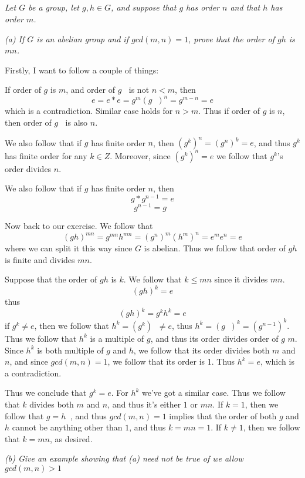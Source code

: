 \documentclass[11pt,oneside,titlepage]{book}
\DeclareMathOperator \inv {^{-1}}
\begin{document}
\subsection{}

\textit{Let $G$ be a group, let $g, h \in G$, and suppose that $g$ has
  order $n$ and that $h$ has order $m$.}

\textit{(a) If $G$ is an abelian group and if $gcd(m, n) = 1$, prove that
  the order of $gh$ is $mn$.}

Firstly, I want to follow a couple of things:

If order of $g$ is $m$, and order of $g\inv$ is not $n < m$, then
$$e = e * e = g^m (g\inv)^n = g^{m - n} = e$$
which is a contradiction. Similar case holds for $n > m$.  Thus if
order of $g$ is $n$, then order of $g\inv$ is also $n$.

We also follow that if $g$ has finite order $n$, then $(g^k)^n =
(g^n)^k = e$, and thus $g^k$ has finite order for any $k \in Z$.
Moreover, since $(g^k)^n = e$ we follow that $g^k$'s order divides $n$.

We also follow that if $g$ has finite order $n$, then
$$g * g^{n - 1} = e$$
$$g^{n - 1} = g\inv$$


Now back to our exercise. We follow that
$$(gh)^{mn} = g^{mn} h^{mn} = (g^{n})^m (h^m)^n = e^m e^n = e$$
where we can split it this way since $G$ is abelian. Thus we follow
that order of $gh$ is finite and divides $mn$.

Suppose that the order of $gh$ is $k$. We follow that $k \leq mn$
since it divides $mn$.
$$(gh)^k = e$$
thus
$$(gh)^k = g^k h^k = e$$
if $g^k \neq e$, then we follow that $h^k = (g^k) \inv \neq e$, thus
$h^k = (g\inv)^k = (g^{n - 1})^k$. Thus we follow that $h^k$ is a
multiple of $g$, and thus its order divides order of $g$ $m$. Since
$h^k$ is both multiple of $g$ and $h$, we follow that its order
divides both $m$ and $n$, and since $gcd(m, n) = 1$, we follow that
its order is 1. Thus $h^k = e$, which is a contradiction.

Thus we conclude that $g^k = e$. For $h^k$ we've got a similar
case. Thus we follow that $k$ divides both $m$ and $n$, and thus it's
either $1$ or $mn$. If $k = 1$, then we follow that $g = h\inv$, and
thus $gcd(m, n) = 1$ implies that the order of both $g$ and $h$ cannot
be anything other than $1$, and thus $k = mn = 1$.
If $k \neq 1$, then we follow that $k = mn$, as desired.

\textit{(b) Give an example showing that (a) need not be true of we
allow $gcd(m, n) > 1$}
\end{document}
